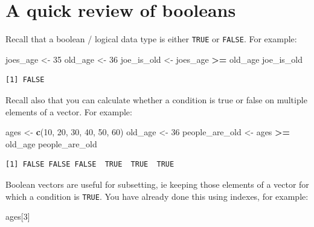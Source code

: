 \documentclass[
]{book}
\newenvironment{Shaded}{\begin{snugshade}}{\end{snugshade}}
\newcommand{\DecValTok}[1]{\textcolor[rgb]{0.00,0.00,0.81}{#1}}
\newcommand{\KeywordTok}[1]{\textcolor[rgb]{0.13,0.29,0.53}{\textbf{#1}}}
\newcommand{\NormalTok}[1]{#1}
\newcommand{\OperatorTok}[1]{\textcolor[rgb]{0.81,0.36,0.00}{\textbf{#1}}}
\newcommand{\StringTok}[1]{\textcolor[rgb]{0.31,0.60,0.02}{#1}}
\begin{document}
\hypertarget{a-quick-review-of-booleans}{%
\section*{A quick review of booleans}\label{a-quick-review-of-booleans}}

Recall that a boolean / logical data type is either \texttt{TRUE} or \texttt{FALSE}. For example:

\begin{Shaded}
\begin{Highlighting}[]
\NormalTok{joes_age <-}\StringTok{ }\DecValTok{35}
\NormalTok{old_age <-}\StringTok{ }\DecValTok{36}
\NormalTok{joe_is_old <-}\StringTok{ }\NormalTok{joes_age }\OperatorTok{>=}\StringTok{ }\NormalTok{old_age}
\NormalTok{joe_is_old}
\end{Highlighting}
\end{Shaded}

\begin{verbatim}
[1] FALSE
\end{verbatim}

Recall also that you can calculate whether a condition is true or false on multiple elements of a vector. For example:

\begin{Shaded}
\begin{Highlighting}[]
\NormalTok{ages <-}\StringTok{ }\KeywordTok{c}\NormalTok{(}\DecValTok{10}\NormalTok{, }\DecValTok{20}\NormalTok{, }\DecValTok{30}\NormalTok{, }\DecValTok{40}\NormalTok{, }\DecValTok{50}\NormalTok{, }\DecValTok{60}\NormalTok{)}
\NormalTok{old_age <-}\StringTok{ }\DecValTok{36}
\NormalTok{people_are_old <-}\StringTok{ }\NormalTok{ages }\OperatorTok{>=}\StringTok{ }\NormalTok{old_age}
\NormalTok{people_are_old}
\end{Highlighting}
\end{Shaded}

\begin{verbatim}
[1] FALSE FALSE FALSE  TRUE  TRUE  TRUE
\end{verbatim}

Boolean vectors are useful for subsetting, ie keeping those elements of a vector for which a condition is \texttt{TRUE}. You have already done this using indexes, for example:

\begin{Shaded}
\begin{Highlighting}[]
\NormalTok{ages[}\DecValTok{3}\NormalTok{]}
\end{Highlighting}
\end{Shaded}
\end{document}
